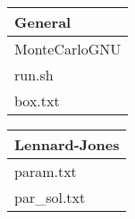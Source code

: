 \begin{tabular}{l}
	General \\ \hline
	MonteCarloGNU \\
	run.sh \\
	box.txt \\
\end{tabular}
\hspace{0.5cm}
\begin{tabular}{l}
	Lennard-Jones \\ \hline
	param.txt \\
	par\_sol.txt \\
\end{tabular}